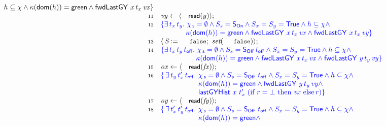 \documentclass[a4paper,UKenglish]{lipics-v2016}
\newcommand{\asgn}{\leftarrow}
\newcommand{\dom}[1]{\mathsf{dom}(#1)}
\newcommand{\specK}[1]{\ensuremath{\textcolor{blue}{#1}}}
\newcommand{\act}[1]{\textsf{\small{#1}}}
\newcommand{\aux}[1]{\textit{#1}}
\newcommand{\esc}[1]{\text{\texttt{\small{#1}}}}
\newcommand{\selfsub}{\mathsf{s}}
\newcommand{\hist}{\chi}
\newcommand{\histS}{\hist_{\, \selfsub}}
\newcommand{\hempty}{\emptyset}
\newcommand{\ldot}{\mathord{.}\,}
\def\TT{\mathsf{True}}
\newcommand{\C}{\kappa}
\newcommand{\sOn}{\mathsf{S_{On}}}
\newcommand{\sOff}{\mathsf{S_{Off}}}
\newcommand{\var}[1]{\mathit{#1}}
\newcommand{\num}[1]{{\text{{\scriptsize{#1}}}}}
\def\lat{\langle}
\def\rat{\rangle}
\def\tbnd{\asgn}
\newcommand{\actwrite}[2]{{#1}\,{:=}\,{#2}}
\theoremstyle{definition}
\begin{document}
\begin{figure}[!htp]
\[\begin{array}[t]{r l}
{                h \subseteq \hist \wedge \C(\dom{h}) = \mathsf{green} \wedge    
                \botLGY\ x\, t_x\, \var{vx} \}} \\
  \num{11} & \var{vy} \tbnd \lat \act{read}(y) \rat;\\
  \num{12} & \specK{\{ \exists\, t_x\, t_y\ldot\, \histS = \hempty \wedge
              \sss = \sOn \wedge \sx = \sy = \TT  \wedge
              h \subseteq \hist \wedge}\\
           & \specK{\hphantom{\{ \exists\, t_x \, t_y\ldot}
             \C(\dom{h}) = \mathsf{green} \wedge    
            \botLGY\ x\, t_x\, \var{vx} \wedge \botLGY\ x\, t_x\, \var{vy}\}} \\
  \num{13} &\lat\,\actwrite{\s}{\esc{false}};\ \aux{set}(\esc{false}) \rat;\\\
  \num{14} & \specK{\{ \exists\, t_x\, t_y\, \toff \ldot\, \histS = \hempty \wedge
             \sss = \sOff\, \toff \wedge \sx = \sy = \TT  \wedge
             h \subseteq \hist \wedge}\\
           & \specK{\hphantom{\{ \exists\, t_x \, t_y\, \toff\ldot}
             \C(\dom{h}) = \mathsf{green} \wedge    
            \botLGY\ x\, t_x\, \var{vx} \wedge \botLGY\ y\, t_y\, \var{vy}\}} \\
  \num{15} & \var{ox} \tbnd \lat \act{read}(\var{\fx}) \rat;\\
  \num{16} & \specK{\{\, \exists\, t_y\, t'_x\, \toff \ldot\,
              \histS = \hempty \wedge
              \sss = \sOff\ \toff \wedge \sx = \sy = \TT \wedge
              h \subseteq \hist \wedge}\\
           & \specK{\hphantom{\{\, \exists\, t_y\, t'_x\, \toff \ldot}\,
              \C(\dom{h}) = \mathsf{green} \wedge
              \botLGY\ y\, t_y\, \var{vy} \wedge}\\
           & \specK{\hphantom{\{\, \exists\, t_y\, t'_x\, \toff \ldot}\,
              \histLGY\ x\ t'_x\ (\textrm{if}\ r = \bot\
                   \textrm{then}\ \var{vx}\ \textrm{else}\, r)\}}\\
  \num{17} & \var{oy} \tbnd \lat \act{read}(\var{\fy}) \rat;\\
  \num{18} & \specK{\{\, \exists\, t'_x\, t'_y\, \toff \ldot\,
              \histS = \hempty \wedge
              \sss = \sOff\ \toff \wedge \sx = \sy = \TT \wedge
              h \subseteq \hist \wedge}\\
             & \specK{\hphantom{\{\,
                  \exists\, t'_x\, t'_y\, \toff \ldot}\,
              \C(\dom{h}) = \mathsf{green} \wedge
}
\end{array}\]
\end{figure}
\end{document}
